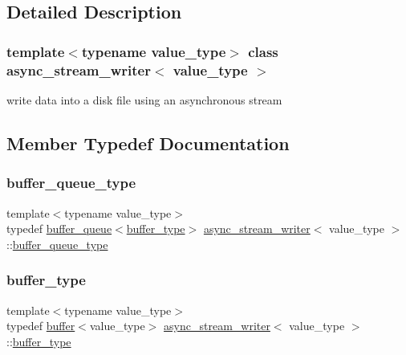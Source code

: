 \subsection{Detailed Description}
\subsubsection*{template$<$typename value\+\_\+type$>$\newline
class async\+\_\+stream\+\_\+writer$<$ value\+\_\+type $>$}

write data into a disk file using an asynchronous stream 

\subsection{Member Typedef Documentation}
\mbox{\label{classasync__stream__writer_a44dba276c5208314653dd887010e7161}} 
\subsubsection{\texorpdfstring{buffer\+\_\+queue\+\_\+type}{buffer\_queue\_type}}
{\footnotesize\ttfamily template$<$typename value\+\_\+type$>$ \\
typedef \hyperlink{structbuffer__queue}{buffer\+\_\+queue}$<$\hyperlink{classasync__stream__writer_a7e813664993581eab8d5fc6bcff2ce19}{buffer\+\_\+type}$>$ \hyperlink{classasync__stream__writer}{async\+\_\+stream\+\_\+writer}$<$ value\+\_\+type $>$\+::\hyperlink{classasync__stream__writer_a44dba276c5208314653dd887010e7161}{buffer\+\_\+queue\+\_\+type}\hspace{0.3cm}{\ttfamily [private]}}

\mbox{\label{classasync__stream__writer_a7e813664993581eab8d5fc6bcff2ce19}} 
\subsubsection{\texorpdfstring{buffer\+\_\+type}{buffer\_type}}
{\footnotesize\ttfamily template$<$typename value\+\_\+type$>$ \\
typedef \hyperlink{structbuffer}{buffer}$<$value\+\_\+type$>$ \hyperlink{classasync__stream__writer}{async\+\_\+stream\+\_\+writer}$<$ value\+\_\+type $>$\+::\hyperlink{classasync__stream__writer_a7e813664993581eab8d5fc6bcff2ce19}{buffer\+\_\+type}\hspace{0.3cm}{\ttfamily [private]}}



